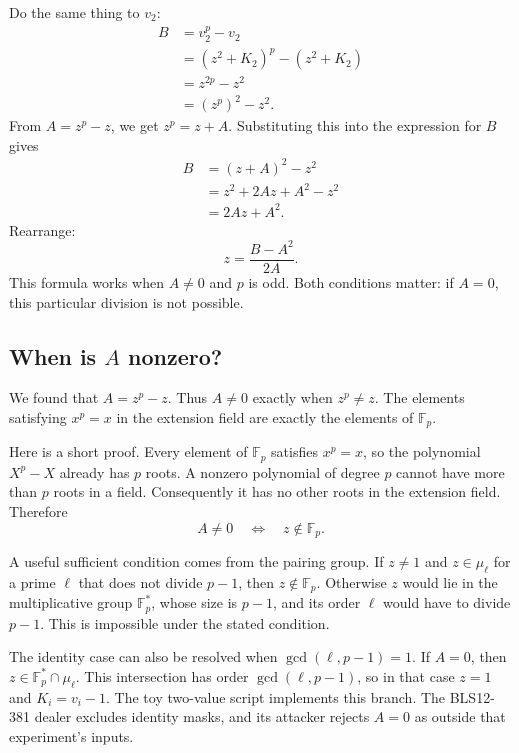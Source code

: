 \documentclass[11pt]{article}
\begin{document}
Do the same thing to $v_2$:
\begin{align*}
    B&=v_2^p-v_2\\
     &=(z^2+K_2)^p-(z^2+K_2)\\
     &=z^{2p}-z^2\\
     &=(z^p)^2-z^2.
\end{align*}
From $A=z^p-z$, we get $z^p=z+A$. Substituting this into the expression for $B$ gives
\begin{align*}
    B&=(z+A)^2-z^2\\
     &=z^2+2Az+A^2-z^2\\
     &=2Az+A^2.
\end{align*}
Rearrange:
\begin{equation}
    \boxed{z=\frac{B-A^2}{2A}.}
    \label{eq:two-value-z}
\end{equation}
This formula works when $A\ne0$ and $p$ is odd. Both conditions matter: if $A=0$, this particular division is not possible.

\subsection{\texorpdfstring{When is $A$ nonzero?}{When is A nonzero?}}

We found that $A=z^p-z$. Thus $A\ne0$ exactly when $z^p\ne z$. The elements satisfying $x^p=x$ in the extension field are exactly the elements of $\mathbb F_p$.

Here is a short proof. Every element of $\mathbb F_p$ satisfies $x^p=x$, so the polynomial $X^p-X$ already has $p$ roots. A nonzero polynomial of degree $p$ cannot have more than $p$ roots in a field. Consequently it has no other roots in the extension field. Therefore
\[
    \boxed{A\ne0\quad\Longleftrightarrow\quad z\notin\mathbb F_p.}
\]

A useful sufficient condition comes from the pairing group. If $z\ne1$ and $z\in\mu_\ell$ for a prime $\ell$ that does not divide $p-1$, then $z\notin\mathbb F_p$. Otherwise $z$ would lie in the multiplicative group $\mathbb F_p^*$, whose size is $p-1$, and its order $\ell$ would have to divide $p-1$. This is impossible under the stated condition.

The identity case can also be resolved when $\gcd(\ell,p-1)=1$.
If $A=0$, then $z\in\mathbb F_p^*\cap\mu_\ell$. This intersection has
order $\gcd(\ell,p-1)$, so in that case $z=1$ and $K_i=v_i-1$.
The toy two-value script implements this branch. The BLS12-381 dealer
excludes identity masks, and its attacker rejects $A=0$ as outside that
experiment's inputs.
\end{document}
